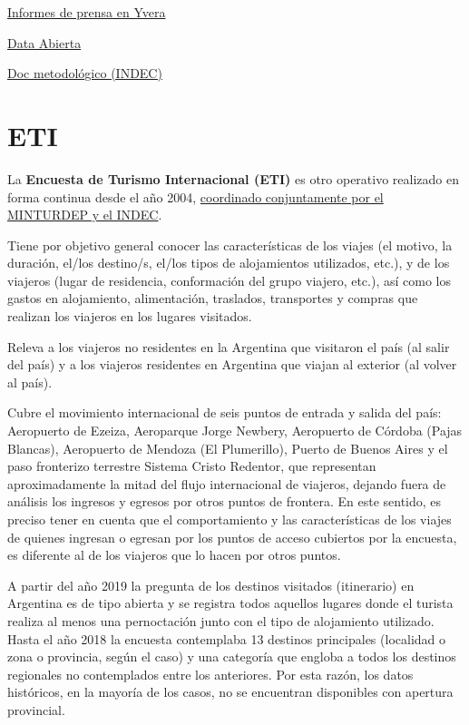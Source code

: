\documentclass[
]{book}
\begin{document}
\href{https://www.yvera.tur.ar/estadistica/info/encuesta-de-ocupacion-hotelera-eoh}{Informes de prensa en Yvera}

\href{http://datos.yvera.tur.ar/dataset/encuesta-ocupacion-hotelera-parahotelera-eoh}{Data Abierta}

\href{https://www.indec.gob.ar/ftp/cuadros/economia/eoh_aspectos_metodologicos.pdf}{Doc metodológico (INDEC)}

\hypertarget{eti}{%
\section{ETI}\label{eti}}

La \textbf{Encuesta de Turismo Internacional (ETI)} es otro operativo realizado en forma continua desde el año 2004, \href{https://www.indec.gob.ar/indec/web/Nivel4-Tema-3-13-55}{coordinado conjuntamente por el MINTURDEP y el INDEC}.

Tiene por objetivo general conocer las características de los viajes (el motivo, la duración, el/los destino/s, el/los tipos de alojamientos utilizados, etc.), y de los viajeros (lugar de residencia, conformación del grupo viajero, etc.), así como los gastos en alojamiento, alimentación, traslados, transportes y compras que realizan los viajeros en los lugares visitados.

Releva a los viajeros no residentes en la Argentina que visitaron el país (al salir del país) y a los viajeros residentes en Argentina que viajan al exterior (al volver al país).

Cubre el movimiento internacional de seis puntos de entrada y salida del país: Aeropuerto de Ezeiza, Aeroparque Jorge Newbery, Aeropuerto de Córdoba (Pajas Blancas), Aeropuerto de Mendoza (El Plumerillo), Puerto de Buenos Aires y el paso fronterizo terrestre Sistema Cristo Redentor, que representan aproximadamente la mitad del flujo internacional de viajeros, dejando fuera de análisis los ingresos y egresos por otros puntos de frontera.
En este sentido, es preciso tener en cuenta que el comportamiento y las características de los viajes de quienes ingresan o egresan por los puntos de acceso cubiertos por la encuesta, es diferente al de los viajeros que lo hacen por otros puntos.

A partir del año 2019 la pregunta de los destinos visitados (itinerario) en Argentina es de tipo abierta y se registra todos aquellos lugares donde el turista realiza al menos una pernoctación junto con el tipo de alojamiento utilizado.
Hasta el año 2018 la encuesta contemplaba 13 destinos principales (localidad o zona o provincia, según el caso) y una categoría que engloba a todos los destinos regionales no contemplados entre los anteriores.
Por esta razón, los datos históricos, en la mayoría de los casos, no se encuentran disponibles con apertura provincial.
\end{document}
